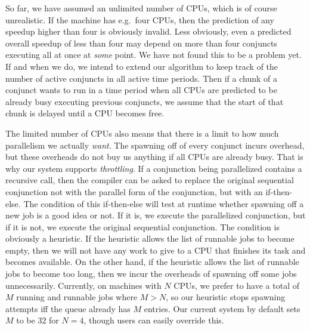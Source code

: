 So far, we have assumed an unlimited number of CPUs,
which is of course unrealistic.
If the machine has e.g.\ four CPUs,
then the prediction of any speedup higher than four is obviously invalid.
Less obviously,
even a predicted overall speedup of less than four may depend
on more than four conjuncts executing all at once at \emph{some} point.
We have not found this to be a problem yet.
If and when we do,
we intend to extend our algorithm to keep track
of the number of active conjuncts in all active time periods.
Then if a chunk of a conjunct wants to run in a time period
when all CPUs are predicted to be already busy executing previous conjuncts,
we assume that the start of that chunk is delayed until a CPU becomes free.

The limited number of CPUs also means that
there is a limit to how much parallelism we actually \emph{want}.
The spawning off of every conjunct incurs overhead,
but these overheads do not buy us anything if all CPUs are already busy.
That is why our system supports \emph{throttling}.
If a conjunction being parallelized contains a recursive call,
then the compiler can be asked to replace the original sequential conjunction
not with the parallel form of the conjunction,
but with an if-then-else.
The condition of this if-then-else
will test at runtime
whether spawning off a new job is a good idea or not.
If it is, we execute the parallelized conjunction, but
if it is not, we execute the original sequential conjunction.
The condition is obviously a heuristic.
If the heuristic allows the list of runnable jobs to become empty,
then we will not have any work to give to a CPU
that finishes its task and becomes available.
On the other hand,
if the heuristic allows the list of runnable jobs to become too long,
then we incur the overheads of spawning off some jobs unnecessarily.
Currently, on machines with $N$ CPUs,
we prefer to have a total of $M$ running and runnable jobs where $M > N$,
so our heuristic stops spawning attempts
iff the queue already has $M$ entries.
Our current system by default sets $M$ to be $32$ for $N = 4$,
though users can easily override this.


